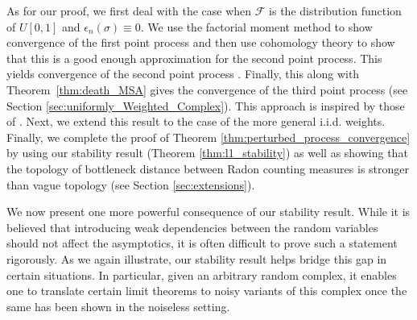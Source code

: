 \documentclass[12pt]{amsart}
\newcommand{\Exp}{\mathbb{E}}
\newcommand{\gt}[1]{\textcolor{blue}{#1}}
\renewcommand{\gt}[1]{#1}
\numberwithin{equation}{section}
\numberwithin{theorem}{section}
\newcommand{\1}{\mathbf{1}}
\def\sF{\mathscr{F}}
\begin{document}
As for our proof, we first deal with the case when $\sF$ is the distribution function of $U[0,1]$ and $\epsilon_n(\sigma) \equiv 0.$ We use the factorial moment method to show convergence of the first point process and then use cohomology theory to show that this is a good enough approximation for the second point process. This yields convergence of the second point process . Finally, this along with Theorem~\ref{thm:death_MSA} gives the convergence of the third point process (see Section \ref{sec:uniformly_Weighted_Complex}). This approach is inspired by those of \cite{linial2006homological, meshulam2009homological, kahle2014inside}. Next, we extend this result to the case of the more general i.i.d. weights. Finally, we complete the proof of Theorem \ref{thm:perturbed_process_convergence} by using our stability result (Theorem \ref{thm:l1_stability}) as well as showing that the topology of bottleneck distance between Radon counting measures is stronger than vague topology (see Section \ref{sec:extensions}).
%

We now present one more powerful consequence of our stability result. While it is believed that introducing weak dependencies between the random variables should not affect the asymptotics, it is  often difficult to prove such a statement rigorously. As we \gt{again illustrate}, our stability result helps bridge this gap in certain situations. In particular, given an arbitrary random complex, it enables one to translate certain limit theorems to noisy variants of this complex once the same has been shown in the noiseless setting.
\end{document}
